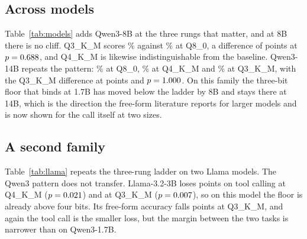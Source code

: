 \documentclass[10pt]{article}
\begin{document}
\subsection{Across models}
\label{sec:models}

Table~\ref{tab:models} adds Qwen3-8B at the three rungs that matter, and at 8B there is no cliff. Q3\_K\_M scores \qtAccEightBThree{}\% against \qtAccEightBEight{}\% at Q8\_0, a difference of \qtDeltaEightBThree{} points at $p=0.688{}$, and Q4\_K\_M is likewise indistinguishable from the baseline. Qwen3-14B repeats the pattern: \qtAccFourteenBEight{}\% at Q8\_0, \qtAccFourteenBFour{}\% at Q4\_K\_M and \qtAccFourteenBThree{}\% at Q3\_K\_M, with the Q3\_K\_M difference at \qtDeltaFourteenBThree{} points and $p=1.000{}$. On this family the three-bit floor that binds at 1.7B has moved below the ladder by 8B and stays there at 14B, which is the direction the free-form literature reports for larger models and is now shown for the call itself at two sizes.

\begin{table}[t]
\centering\small

\caption{Tool calling across model size, \texttt{simple\_python}. Qwen3-1.7B at $n=400$; Qwen3-8B and Qwen3-14B at $n=\qtNEightB{}$. Each model is compared against its own Q8\_0.}
\label{tab:models}
\end{table}

\subsection{A second family}
\label{sec:family}

Table~\ref{tab:llama} repeats the three-rung ladder on two Llama models. The Qwen3 pattern does not transfer. Llama-3.2-3B loses \qtDropLlamaThreeBFour{} points on tool calling at Q4\_K\_M ($p=0.021{}$) and \qtDropLlamaThreeBThree{} at Q3\_K\_M ($p=0.007{}$), so on this model the floor is already above four bits. Its free-form accuracy falls \qtLlamaThreeBGsmDropThree{} points at Q3\_K\_M, and again the tool call is the smaller loss, but the margin between the two tasks is narrower than on Qwen3-1.7B.
\end{document}
